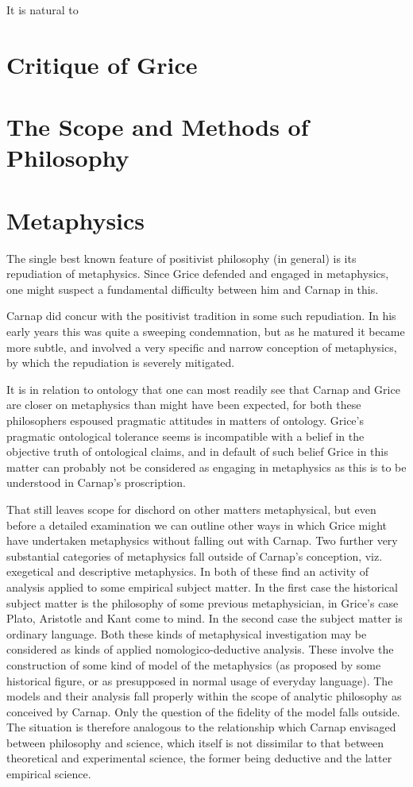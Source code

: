 \documentclass[10pt,titlepage]{book}
\begin{document}
It is natural to


\section{Critique of Grice}

\section{The Scope and Methods of Philosophy}

\section{Metaphysics}

The single best known feature of positivist philosophy (in general) is its repudiation of metaphysics.
Since Grice defended and engaged in metaphysics, one might suspect a fundamental difficulty between him and Carnap in this.

Carnap did concur with the positivist tradition in some such repudiation.
In his early years this was quite a sweeping condemnation, but as he matured it became more subtle, and involved a very specific and narrow conception of metaphysics, by which the repudiation is severely mitigated.

It is in relation to ontology that one can most readily see that Carnap and Grice are closer on metaphysics than might have been expected, for both these philosophers espoused pragmatic attitudes in matters of ontology.
Grice's pragmatic ontological tolerance seems is incompatible with a belief in the objective truth of ontological claims, and in default of such belief Grice in this matter can probably not be considered as engaging in metaphysics as this is to be understood in Carnap's proscription.

That still leaves scope for dischord on other matters metaphysical, but even before a detailed examination we can outline other ways in which Grice might have undertaken metaphysics without falling out with Carnap.
Two further very substantial categories of metaphysics fall outside of Carnap's conception, viz. exegetical and descriptive metaphysics.
In both of these find an activity of analysis applied to some empirical subject matter.
In the first case the historical subject matter is the philosophy of some previous metaphysician, in Grice's case Plato, Aristotle and Kant come to mind.
In the second case the subject matter is ordinary language.
Both these kinds of metaphysical investigation may be considered as kinds of applied nomologico-deductive analysis.
These involve the construction of some kind of model of the metaphysics (as proposed by some historical figure, or as presupposed in normal usage of everyday language).
The models and their analysis fall properly within the scope of analytic philosophy as conceived by Carnap.
Only the question of the fidelity of the model falls outside.
The situation is therefore analogous to the relationship which Carnap envisaged between philosophy and science, which itself is not dissimilar to that between theoretical and experimental science, the former being deductive and the latter empirical science.
\end{document}
